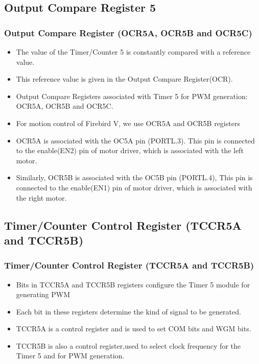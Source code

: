 \documentclass[table,10pt,red]{beamer}	%
\begin{document}
\subsection{Output Compare Register 5} 
\begin{frame}
	\frametitle{Output Compare Register (OCR5A, OCR5B and OCR5C)}
	\begin{itemize}
	  \item <+-|alert@+> The value of the Timer/Counter 5 is constantly compared with a reference value.
	  \item <+-|alert@+> This reference value is given in the Output Compare Register(OCR).
	  \item <+-|alert@+>Output Compare Registers associated with Timer 5 for PWM generation:
	  \pause
	  OCR5A, OCR5B and OCR5C.
	  \pause
	  \item <+-|alert@+> For motion control of Firebird V, we use OCR5A and OCR5B registers
	  \item <+-|alert@+> OCR5A is associated with the OC5A pin (PORTL.3). This pin is connected to the enable(EN2) pin of motor driver, which is associated with the left motor.
	  \item <+-|alert@+> Similarly, OCR5B is associated with the OC5B pin (PORTL.4), This pin is connected to the enable(EN1) pin of motor driver, which is associated with the right motor.
	 	  
	\end{itemize}
\end{frame}

\subsection{Timer/Counter Control Register (TCCR5A and TCCR5B)} %
\begin{frame}
\frametitle{Timer/Counter Control Register (TCCR5A and TCCR5B)}
\begin{itemize}
  \item <+-|alert@+> Bits in TCCR5A and TCCR5B registers configure the Timer 5 module for generating PWM
  \item <+-|alert@+> Each bit in these registers determine the kind of signal to be generated.
  \item <+-|alert@+> TCCR5A is a control register and is used to set COM bits and WGM bits.
  \item <+-|alert@+> TCCR5B is also a control register,used to select clock frequency for the Timer 5 and for PWM generation.   
\end{itemize}
\end{frame}
\end{document}
